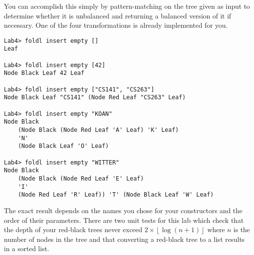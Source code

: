 
\clearpage 

You can accomplish this simply by pattern-matching on the tree given as input to determine whether it is unbalanced and returning a balanced version of it if necessary. One of the four transformations is already implemented for you.

\taskLine


\begin{verbatim}
Lab4> foldl insert empty []
Leaf

Lab4> foldl insert empty [42]
Node Black Leaf 42 Leaf

Lab4> foldl insert empty ["CS141", "CS263"]
Node Black Leaf "CS141" (Node Red Leaf "CS263" Leaf)

Lab4> foldl insert empty "KOAN"
Node Black 
    (Node Black (Node Red Leaf 'A' Leaf) 'K' Leaf) 
    'N' 
    (Node Black Leaf 'O' Leaf)

Lab4> foldl insert empty "WITTER"
Node Black 
    (Node Black (Node Red Leaf 'E' Leaf) 
    'I' 
    (Node Red Leaf 'R' Leaf)) 'T' (Node Black Leaf 'W' Leaf)
\end{verbatim}

The exact result depends on the names you chose for your constructors and the order of their parameters. There are two unit tests for this lab which check that the depth of your red-black trees never exceed $2 \times \left \lfloor{\log(n+1)}\right \rfloor$ where $n$ is the number of nodes in the tree and that converting a red-black tree to a list results in a sorted list.


\taskLine
